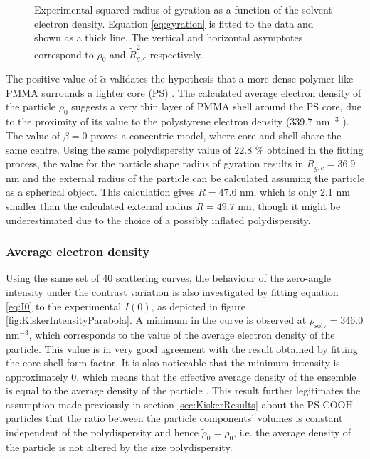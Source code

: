 \begin{figure}%
	\centering
		
		\caption[Radius of gyration of the PS-COOH particles.]{Experimental squared radius of gyration as a function of the solvent electron density. Equation \eqref{eq:gyration} is fitted to the data and shown as a thick line. The vertical and horizontal asymptotes correspond to $\rho_0$ and $\tilde R^2_{g,c}$ respectively.}
		\label{fig:KiskerGuinierRadius}
\end{figure}

The positive value of \(\tilde\alpha\) validates the hypothesis that a more dense polymer like PMMA surrounds a lighter core (PS) \citep{stuhrmann_small-angle_2008}. The calculated average electron density of the particle \(\rho_0\) suggests a very thin layer of PMMA shell around the PS core, due to the proximity of its value to the polystyrene electron density (339.7 nm\(^{-3}\) ). The value of \( \tilde\beta=0\) proves a concentric model, where core and shell share the same centre. Using the same polydispersity value of 22.8 $\%$ obtained in the fitting process, the value for the particle shape radius of gyration results in \(R_{g,c}=36.9\) nm and the external radius of the particle can be calculated assuming the particle as a spherical object. This calculation gives \( R=47.6\) nm, which is only 2.1 nm smaller than the calculated external radius \(R=49.7\) nm, though it might be underestimated due to the choice of a possibly inflated polydispersity. 

\subsubsection{Average electron density}
Using the same set of 40 scattering curves, the behaviour of the zero-angle intensity under the contrast variation is also investigated by fitting equation \eqref{eq:I0} to the experimental \(I(0)\), as depicted in figure \ref{fig:KiskerIntensityParabola}. A minimum in the curve is observed at \(\rho_{\text{solv}}=346.0\) nm\(^{-3}\), which corresponds to the value of the average electron density of the particle. This value is in very good agreement with the result obtained by fitting the core-shell form factor. It is also noticeable that the minimum intensity is approximately 0, which means that the effective average density of the ensemble is equal to the average density of the particle \citep{avdeev_contrast_2007}. This result further legitimates the assumption made previously in section \ref{sec:KiskerResults} about the PS-COOH particles that the ratio between the particle components' volumes is constant independent of the polydispersity and hence \(  \tilde \rho_0 = \rho_0  \), i.e. the average density of the particle is not altered by the size polydispersity.

